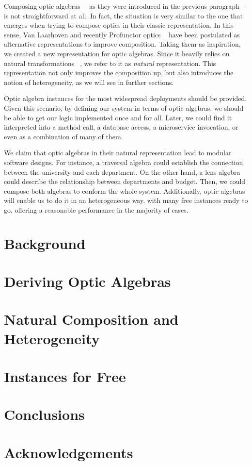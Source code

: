 \documentclass{article}
\begin{document}

Composing optic algebras ---as they were introduced in the previous paragraph---
is not straightforward at all. In fact, the situation is very similar to the one
that emerges when trying to compose optics in their classic representation. In
this sense, Van Laarhoven and recently Profunctor optics
~\cite{pickering2017profunctor} have been postulated as alternative
representations to improve composition. Taking them as inspiration, we created a
new representation for optic algebras. Since it heavily relies on natural
transformations ~\cite{pierce1991basic}, we refer to it as \emph{natural}
representation. This representation not only improves the composition up, but
also introduces the notion of heterogeneity, as we will see in further sections.


Optic algebra instances for the most widespread deployments should be provided.
Given this scenario, by defining our system in terms of optic algebras, we
should be able to get our logic implemented once and for all. Later, we could
find it interpreted into a method call, a database access, a microservice
invocation, or even as a combination of many of them.


We claim that optic algebras in their natural representation lead to modular
software designs. For instance, a traversal algebra could establish the
connection between the university and each department. On the other hand, a lens
algebra could describe the relationship between departments and budget. Then, we
could compose both algebras to conform the whole system. Additionally, optic
algebras will enable us to do it in an heterogeneous way, with many free
instances ready to go, offering a reasonable performance in the majority of
cases.

\section{Background}

\section{Deriving Optic Algebras}

\section{Natural Composition and Heterogeneity}

\section{Instances for Free}

\section{Conclusions}

\section{Acknowledgements}

{}

\end{document}
